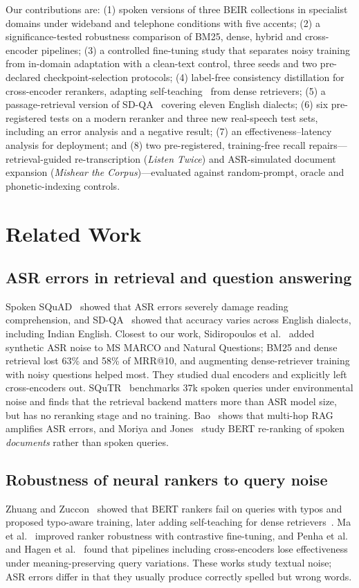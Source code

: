 \documentclass[conference]{IEEEtran}
\begin{document}
Our contributions are: (1) spoken versions of three BEIR collections in specialist domains under wideband and telephone conditions with five accents; (2) a significance-tested robustness comparison of BM25, dense, hybrid and cross-encoder pipelines; (3) a controlled fine-tuning study that separates noisy training from in-domain adaptation with a clean-text control, three seeds and two pre-declared checkpoint-selection protocols; (4) label-free consistency distillation for cross-encoder rerankers, adapting self-teaching~\cite{zhuang22} from dense retrievers; (5) a passage-retrieval version of SD-QA~\cite{sdqa} covering eleven English dialects; (6) six pre-registered tests on a modern reranker and three new real-speech test sets, including an error analysis and a negative result; (7) an effectiveness--latency analysis for deployment; and (8) two pre-registered, training-free recall repairs---retrieval-guided re-transcription (\emph{Listen Twice}) and ASR-simulated document expansion (\emph{Mishear the Corpus})---evaluated against random-prompt, oracle and phonetic-indexing controls.

\section{Related Work}
\subsection{ASR errors in retrieval and question answering}
Spoken SQuAD~\cite{spokensquad} showed that ASR errors severely damage reading comprehension, and SD-QA~\cite{sdqa} showed that accuracy varies across English dialects, including Indian English. Closest to our work, Sidiropoulos et al.~\cite{sidiropoulos} added synthetic ASR noise to MS MARCO and Natural Questions; BM25 and dense retrieval lost 63\% and 58\% of MRR@10, and augmenting dense-retriever training with noisy questions helped most. They studied dual encoders and explicitly left cross-encoders out. SQuTR~\cite{squtr} benchmarks 37k spoken queries under environmental noise and finds that the retrieval backend matters more than ASR model size, but has no reranking stage and no training. Bao~\cite{bao} shows that multi-hop RAG amplifies ASR errors, and Moriya and Jones~\cite{moriya} study BERT re-ranking of spoken \emph{documents} rather than spoken queries.

\subsection{Robustness of neural rankers to query noise}
Zhuang and Zuccon~\cite{zhuang21} showed that BERT rankers fail on queries with typos and proposed typo-aware training, later adding self-teaching for dense retrievers~\cite{zhuang22}. Ma et al.~\cite{ma} improved ranker robustness with contrastive fine-tuning, and Penha et al.~\cite{penha} and Hagen et al.~\cite{hagen} found that pipelines including cross-encoders lose effectiveness under meaning-preserving query variations. These works study textual noise; ASR errors differ in that they usually produce correctly spelled but wrong words.
\end{document}
